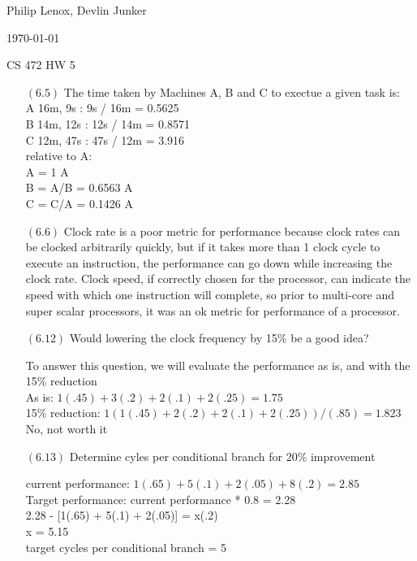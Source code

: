 \documentclass[letterpaper,10pt,titlepage]{article}
\def\name{Philip Lenox, Devlin Junker}
\begin{document}
\hfill \name

\hfill \today

\hfill CS 472 HW 5

\begin{enumerate}

\item[$(6.5)$]The time taken by Machines A, B and C to exectue a given task is:\\
A 16m, 9s : 9s / 16m = 0.5625\\
B 14m, 12s : 12s / 14m = 0.8571\\
C 12m, 47s : 47s / 12m = 3.916\\
relative to A:\\
A = 1 A\\
B = A/B = 0.6563 A\\
C = C/A = 0.1426 A \\

\item[$(6.6)$] Clock rate is a poor metric for performance because clock rates can be clocked arbitrarily quickly, but if it takes more than 1 clock cycle to execute an instruction, the performance can go down while increasing the clock rate. Clock speed, if correctly chosen for the processor, can indicate the speed with which one instruction will complete, so prior to multi-core and super scalar processors, it was an ok metric for performance of a processor. 

\item[$(6.12)$] Would lowering the clock frequency by 15\% be a good idea?

To answer this question, we will evaluate the performance as is, and with the 15\% reduction \\
As is: $1(.45) + 3(.2) + 2(.1) + 2(.25) = 1.75$ \\
15\% reduction: $1(1(.45) + 2(.2) + 2(.1) + 2(.25))/(.85) = 1.823$\\
No, not worth it

\item[$(6.13)$] Determine cyles per conditional branch for 20\% improvement

current performance: $1(.65) + 5(.1) + 2(.05) + 8(.2) = 2.85 $\\
Target performance: current performance * 0.8 = 2.28 \\
2.28 - [1(.65) + 5(.1) + 2(.05)] = x(.2) \\
x = 5.15 \\
target cycles per conditional branch = 5\\


\end{enumerate}
\end{document}
